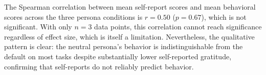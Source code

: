  The Spearman correlation between mean self-report scores and mean behavioral scores across the three persona conditions is $r = 0.50$ ($p = 0.67$), which is not significant. With only $n = 3$ data points, this correlation cannot reach significance regardless of effect size, which is itself a limitation. Nevertheless, the qualitative pattern is clear: the neutral persona's behavior is indistinguishable from the default on most tasks despite substantially lower self-reported gratitude, confirming that self-reports do not reliably predict behavior.
